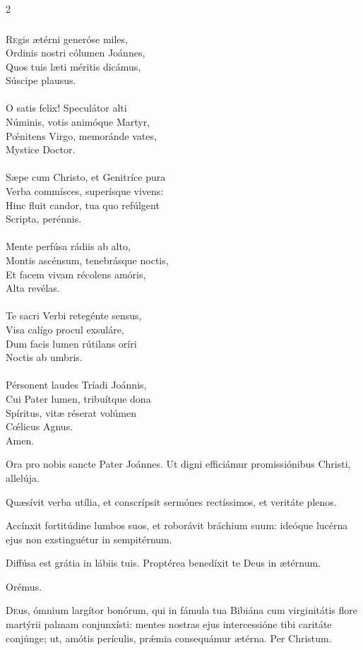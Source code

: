 \documentclass[9pt,twoside]{extarticle}
\begin{document}
\begin{multicols}{2}
\subsubsection*{\center{}}
\lettrine{R}egis ætérni generóse miles,\\ Ordinis nostri cólumen Joánnes,\\ Quos tuis læti méritis dicámus,\\ Súscipe plausus.\\
\\ 
O satis felix! Speculátor alti\\ Núminis, votis animóque Martyr,\\ Pœ́nitens Virgo, memoránde vates,\\ Mystice Doctor.\\
\\
Sæpe cum Christo, et Genitríce pura\\ Verba commísces, superísque vivens:\\ Hinc fluit candor, tua quo refúlgent\\ Scripta, perénnis.\\
\\
Mente perfúsa rádiis ab alto,\\ Montis ascénsum, tenebrásque noctis,\\ Et facem vivam récolens amóris,\\ Alta revélas.\\
\\
Te sacri Verbi retegénte sensus,\\ Visa calígo procul exsuláre,\\ Dum facis lumen rútilans oríri\\ Noctis ab umbris.\\
\\
Pérsonent laudes Tríadi Joánnis,\\ Cui Pater lumen, tribuítque dona\\ Spíritus, vitæ réserat volúmen\\ Cœ́licus Agnus.\\
Amen.
\begin{tightlist}{}
\item {} Ora pro nobis sancte Pater Joánnes.  Ut digni efficiámur promissiónibus Christi, allelúja. 
\item {} Quæsívit verba utília, et conscrípsit sermónes rectíssimos, et veritáte plenos.
\item {} Accínxit fortitúdine lumbos suos, et roborávit bráchium suum: ideóque lucérna ejus non exstinguétur in sempitérnum.
\item {} Diffúsa est grátia in lábiis tuis.  Proptérea benedíxit te Deus in ætérnum.
\item Orémus. \hfill {}
\end{tightlist}
\lettrine{D}eus, ómnium largítor bonórum, qui in fámula tua Bibiána cum virginitátis flore martýrii palmam conjunxísti: mentes nostras ejus intercessióne tibi caritáte conjúnge; ut, amótis perículis, prǽmia consequámur ætérna. Per Christum.


\end{multicols}
\end{document}
